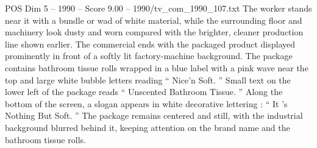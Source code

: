 \begin{textsample}{POS Dim 5 – 1990 – Score 9.00 – 1990/tv\_com\_1990\_107.txt}
The worker stands near it with a bundle or wad of white material, while the surrounding floor and machinery look dusty and worn compared with the brighter, cleaner production line shown earlier.
The commercial ends with the packaged product displayed prominently in front of a softly lit factory-machine background.
The package contains bathroom tissue rolls wrapped in a blue label with a pink wave near the top and large white bubble letters reading “ Nice’n Soft. ” Small text on the lower left of the package reads “ Unscented Bathroom Tissue. ” Along the bottom of the screen, a slogan appears in white decorative lettering : “ It ’s Nothing But Soft. ” The package remains centered and still, with the industrial background blurred behind it, keeping attention on the brand name and the bathroom tissue rolls.

\end{textsample}
